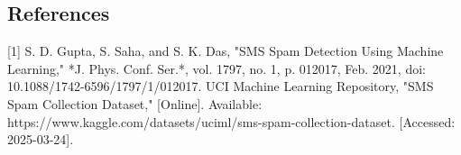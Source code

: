 \documentclass{article}
\begin{document}





\newpage

\noindent


\subsection*{References}

[1] S. D. Gupta, S. Saha, and S. K. Das, "SMS Spam Detection Using Machine Learning," *J. Phys. Conf. Ser.*, vol. 1797, no. 1, p. 012017, Feb. 2021, doi: 10.1088/1742-6596/1797/1/012017.
\newline
\newline
[2] UCI Machine Learning Repository, "SMS Spam Collection Dataset," [Online]. Available: https://www.kaggle.com/datasets/uciml/sms-spam-collection-dataset. [Accessed: 2025-03-24].




\newpage
\end{document}
